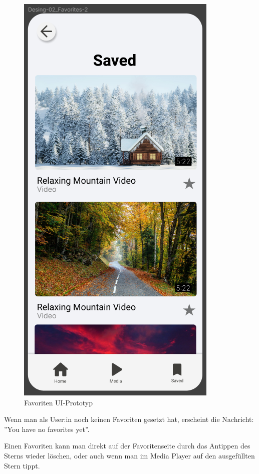 \begin{figure}[H]
    \centering
    \includegraphics[height=\textwidth]{./pics/pFavoriten.png}
    \caption{Favoriten UI-Prototyp}
\end{figure}

\newpage

Wenn man als User:in noch keinen Favoriten gesetzt hat, erscheint die Nachricht: ''You have no favorites yet''.

Einen Favoriten kann man direkt auf der Favoritenseite durch das Antippen des Sterns wieder löschen, oder auch wenn
man im Media Player auf den ausgefüllten Stern tippt.

